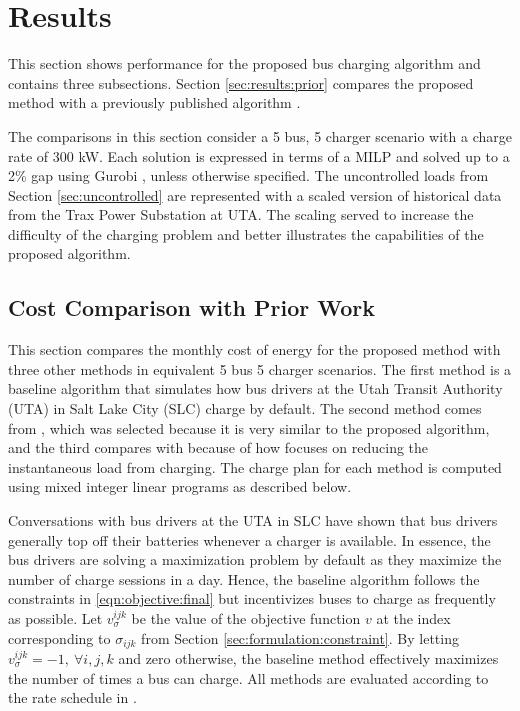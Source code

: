 \section{Results\label{sec:results}}
This section shows performance for the proposed bus charging algorithm and contains three subsections. Section \ref{sec:results:prior} compares the proposed method with a previously published algorithm \cite{He_2022_Battery}. 
\par The comparisons in this section consider a 5 bus, 5 charger scenario with a charge rate of 300 kW. Each solution is expressed in terms of a MILP and solved up to a 2\% gap using Gurobi \cite{gurobi}, unless otherwise specified. The uncontrolled loads from Section \ref{sec:uncontrolled} are represented with a scaled version of historical data from the Trax Power Substation at UTA. The scaling served to increase the difficulty of the charging problem and better illustrates the capabilities of the proposed algorithm. 

\subsection{Cost Comparison with Prior Work\label{sec:results:prior}} 
This section compares the monthly cost of energy for the proposed method with three other methods in equivalent 5 bus 5 charger scenarios. The first method is a baseline algorithm that simulates how bus drivers at the Utah Transit Authority (UTA) in Salt Lake City (SLC) charge by default. The second method comes from \cite{He_2019_Fast}, which was selected because it is very similar to the proposed algorithm, and the third compares with \cite{ojer_development_2020} because of how \cite{ojer_development_2020} focuses on reducing the instantaneous load from charging. The charge plan for each method is computed using mixed integer linear programs as described below.  
\par Conversations with bus drivers at the UTA in SLC have shown that bus drivers generally top off their batteries whenever a charger is available. In essence, the bus drivers are solving a maximization problem by default as they maximize the number of charge sessions in a day. Hence, the baseline algorithm follows the constraints in \eqref{eqn:objective:final} but incentivizes buses to charge as frequently as possible. Let $v_{\sigma}^{ijk}$ be the value of the objective function $v$ at the index corresponding to $\sigma_{ijk}$ from Section \ref{sec:formulation:constraint}. By letting $v^{ijk}_{\sigma} = -1, \ \forall i,j,k$ and zero otherwise, the baseline method effectively maximizes the number of times a bus can charge.  
 All methods are evaluated according to the rate schedule in \cite{rocky_mountain_power_rocky_2021}. 

